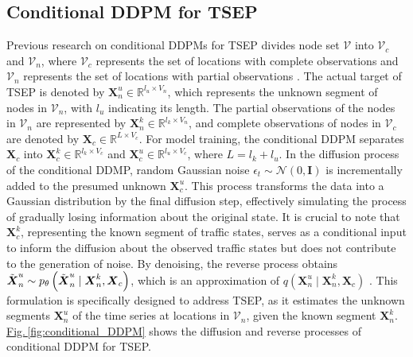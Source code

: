 \documentclass[a4paper,fleqn,12pt]{cas-sc}
\newcommand{\rev}[1]{{\color{red} #1}}
\begin{document}
\subsection{Conditional DDPM for TSEP}
Previous research on conditional DDPMs for TSEP divides node set $\boldsymbol{\mathcal{V}}$ into $\boldsymbol{\mathcal{V}}_{c}$ and $\boldsymbol{\mathcal{V}}_{n}$, where $\boldsymbol{\mathcal{V}}_{c}$ represents the set of locations with complete observations and $\boldsymbol{\mathcal{V}}_{n}$ represents the set of locations with partial observations \citep{wen2023diffstg}. The actual target of TSEP is denoted by $\boldsymbol{X}_{n}^{u}\in\mathbb{R}^{l_{u}\times V_n}$, which represents the unknown segment of nodes in $\boldsymbol{\mathcal{V}}_{n}$, with $l_{u}$ indicating its length. The partial observations of the nodes in $\boldsymbol{\mathcal{V}}_{n}$ are represented by $\boldsymbol{X}_{n}^{k}\in\mathbb{R}^{l_{k}\times V_{n}}$, and complete observations of nodes in $\boldsymbol{\mathcal{V}}_{c}$ are denoted by $\boldsymbol{X}_{c}\in\mathbb{R}^{L\times V_{c}}$. For model training, the conditional DDPM separates $\boldsymbol{X}_{c}$ into $\boldsymbol{X}_{c}^{k}\in\mathbb{R}^{l_{k}\times V_{c}}$ and $\boldsymbol{X}_{c}^{u}\in\mathbb{R}^{l_{u}\times V_{c}}$, where $L = l_{k} + l_{u}$. \rev{In the diffusion process of the conditional DDMP, random Gaussian noise $\epsilon_t \sim \mathcal{N}(0, \mathbf{I})$ is incrementally added to the presumed unknown $\mathbf{X}^u_c$. This process transforms the data into a Gaussian distribution by the final diffusion step, effectively simulating the process of gradually losing information about the original state. It is crucial to note that $\mathbf{X}^k_c$, representing the known segment of traffic states, serves as a conditional input to inform the diffusion about the observed traffic states but does not contribute to the generation of noise.} By denoising, the reverse process obtains $\Tilde{\boldsymbol{X}}^{u}_{n}\sim p_{\theta}\left(\Tilde{\boldsymbol{X}}^{u}_{n} \mid \boldsymbol{X}^{k}_{n},\boldsymbol{X}_{c}\right)$, which is an approximation of $q\left(\boldsymbol{X}_{n}^{u} \mid \boldsymbol{X}_{n}^{k}, \boldsymbol{X}_{c}\right)$ \citep{tashiro2021csdi}. This formulation is specifically designed to address TSEP, as it estimates the unknown segments $\boldsymbol{X}_{n}^{u}$ of the time series at locations in $\boldsymbol{\mathcal{V}}_{n}$, given the known segment $\boldsymbol{X}_{n}^{k}$. \hyperref[fig:conditional_DDPM]{Fig.\,\ref{fig:conditional_DDPM}} shows the diffusion and reverse processes of conditional DDPM for TSEP.
\end{document}
